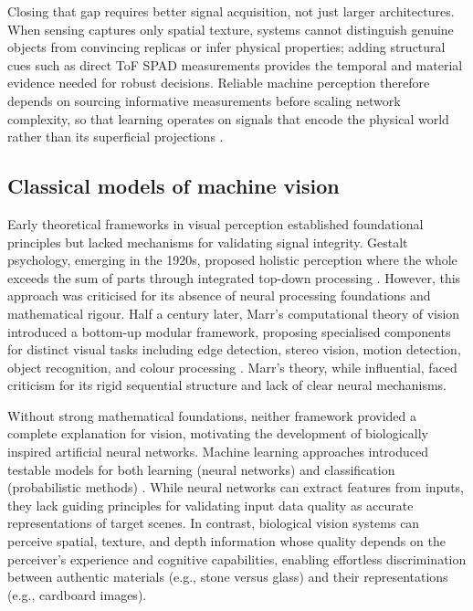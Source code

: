 \documentclass[12pt,a4paper,oneside]{report}
\begin{document}
Closing that gap requires better signal acquisition, not just larger architectures. When sensing captures only spatial texture, systems cannot distinguish genuine objects from convincing replicas or infer physical properties; adding structural cues such as direct ToF SPAD measurements provides the temporal and material evidence needed for robust decisions. Reliable machine perception therefore depends on sourcing informative measurements before scaling network complexity, so that learning operates on signals that encode the physical world rather than its superficial projections \cite{rani2025}.

\vspace{1cm}
\noindent\begin{minipage}{\textwidth}
\setlength{\parindent}{0pt}%
\setlength{\leftskip}{0pt}%
\setlength{\rightskip}{0pt}%
\setlength{\emergencystretch}{3em}%
%
\footnotesize%
\ttfamily%
\color{textgrey}%
\justifying%
\sloppy%
\noindent\quotetwo
\end{minipage}

\subsection{Classical models of machine vision}
\label{subsec:classical_models}

Early theoretical frameworks in visual perception established foundational principles but lacked mechanisms for validating signal integrity. Gestalt psychology, emerging in the 1920s, proposed holistic perception where the whole exceeds the sum of parts through integrated top-down processing \cite{palmer1999}. However, this approach was criticised for its absence of neural processing foundations and mathematical rigour. Half a century later, Marr's computational theory of vision introduced a bottom-up modular framework, proposing specialised components for distinct visual tasks including edge detection, stereo vision, motion detection, object recognition, and colour processing \cite{marr2010}. Marr's theory, while influential, faced criticism for its rigid sequential structure and lack of clear neural mechanisms.

Without strong mathematical foundations, neither framework provided a complete explanation for vision, motivating the development of biologically inspired artificial neural networks. Machine learning approaches introduced testable models for both learning (neural networks) and classification (probabilistic methods) \cite{lecun1998,fukushima1980}. While neural networks can extract features from inputs, they lack guiding principles for validating input data quality as accurate representations of target scenes. In contrast, biological vision systems can perceive spatial, texture, and depth information whose quality depends on the perceiver's experience and cognitive capabilities, enabling effortless discrimination between authentic materials (e.g., stone versus glass) and their representations (e.g., cardboard images).
\end{document}
